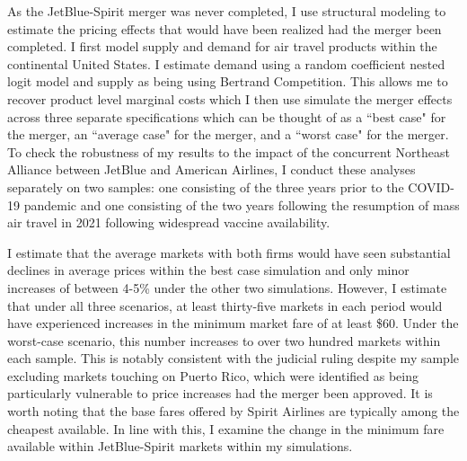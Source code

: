 \documentclass{article}
\begin{document}

    As the JetBlue-Spirit merger was never completed, I  use structural modeling to estimate the pricing effects that would have been realized had the merger been completed. I first model supply and demand for air travel products within the continental United States. I estimate demand using a random coefficient nested logit model and supply as being using Bertrand Competition. This allows me to recover product level marginal costs which I then use simulate the merger effects across three separate specifications which can be thought of as a ``best case" for the merger, an ``average case" for the merger, and a ``worst case" for the merger. To check the robustness of my results to the impact of the concurrent Northeast Alliance between JetBlue and American Airlines, I conduct these analyses separately on two samples: one consisting of the three years prior to the COVID-19 pandemic and one consisting of the two years following the resumption of mass air travel in 2021 following widespread vaccine availability. 

    I estimate that the average markets with both firms would have seen substantial declines in average prices within the best case simulation and only minor increases of between 4-5\% under the other two simulations. However, I estimate that under all three scenarios, at least thirty-five markets in each period would have experienced increases in the minimum market fare of at least \$60. Under the worst-case scenario, this number increases to over two hundred markets within each sample. This is notably consistent with the judicial ruling despite my sample excluding markets touching on Puerto Rico, which were identified as being particularly vulnerable to price increases had the merger been approved. It is worth noting that the base fares offered by Spirit Airlines are typically among the cheapest available. In line with this, I examine the change in the minimum fare available within JetBlue-Spirit markets within my simulations.

\end{document}
